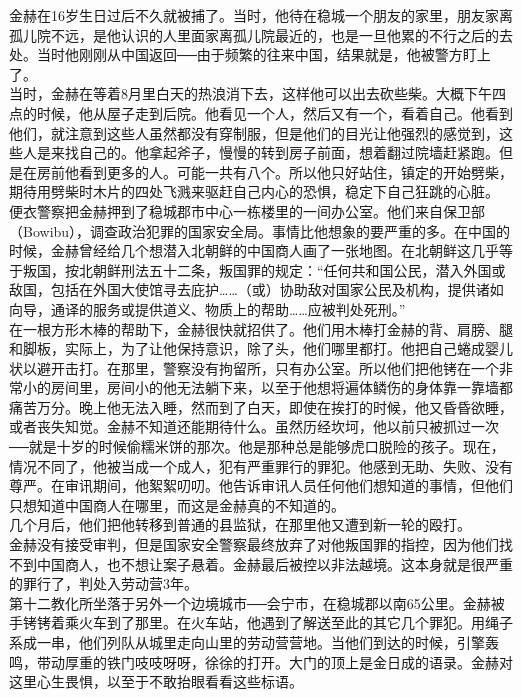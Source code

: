 金赫在16岁生日过后不久就被捕了。当时，他待在稳城一个朋友的家里，朋友家离孤儿院不远，是他认识的人里面家离孤儿院最近的，也是一旦他累的不行之后的去处。当时他刚刚从中国返回──由于频繁的往来中国，结果就是，他被警方盯上了。\\

当时，金赫在等着8月里白天的热浪消下去，这样他可以出去砍些柴。大概下午四点的时候，他从屋子走到后院。他看见一个人，然后又有一个，看着自己。他看到他们，就注意到这些人虽然都没有穿制服，但是他们的目光让他强烈的感觉到，这些人是来找自己的。他拿起斧子，慢慢的转到房子前面，想着翻过院墙赶紧跑。但是在房前他看到更多的人。可能一共有八个。所以他只好站住，镇定的开始劈柴，期待用劈柴时木片的四处飞溅来驱赶自己内心的恐惧，稳定下自己狂跳的心脏。\\

便衣警察把金赫押到了稳城郡市中心一栋楼里的一间办公室。他们来自保卫部（Bowibu），调查政治犯罪的国家安全局。事情比他想象的要严重的多。在中国的时候，金赫曾经给几个想潜入北朝鲜的中国商人画了一张地图。在北朝鲜这几乎等于叛国，按北朝鲜刑法五十二条，叛国罪的规定：“任何共和国公民，潜入外国或敌国，包括在外国大使馆寻去庇护……（或）协助敌对国家公民及机构，提供诸如向导，通译的服务或提供道义、物质上的帮助……应被判处死刑。”\\

在一根方形木棒的帮助下，金赫很快就招供了。他们用木棒打金赫的背、肩膀、腿和脚板，实际上，为了让他保持意识，除了头，他们哪里都打。他把自己蜷成婴儿状以避开击打。在那里，警察没有拘留所，只有办公室。所以他们把他铐在一个非常小的房间里，房间小的他无法躺下来，以至于他想将遍体鳞伤的身体靠一靠墙都痛苦万分。晚上他无法入睡，然而到了白天，即使在挨打的时候，他又昏昏欲睡，或者丧失知觉。金赫不知道还能期待什么。虽然历经坎坷，他以前只被抓过一次──就是十岁的时候偷糯米饼的那次。他是那种总是能够虎口脱险的孩子。现在，情况不同了，他被当成一个成人，犯有严重罪行的罪犯。他感到无助、失败、没有尊严。在审讯期间，他絮絮叨叨。他告诉审讯人员任何他们想知道的事情，但他们只想知道中国商人在哪里，而这是金赫真的不知道的。\\

几个月后，他们把他转移到普通的县监狱，在那里他又遭到新一轮的殴打。\\

金赫没有接受审判，但是国家安全警察最终放弃了对他叛国罪的指控，因为他们找不到中国商人，也不想让案子悬着。金赫最后被控以非法越境。这本身就是很严重的罪行了，判处入劳动营3年。\\

第十二教化所坐落于另外一个边境城市──会宁市，在稳城郡以南65公里。金赫被手铐铐着乘火车到了那里。在火车站，他遇到了解送至此的其它几个罪犯。用绳子系成一串，他们列队从城里走向山里的劳动营营地。当他们到达的时候，引擎轰鸣，带动厚重的铁门吱吱呀呀，徐徐的打开。大门的顶上是金日成的语录。金赫对这里心生畏惧，以至于不敢抬眼看看这些标语。\\

